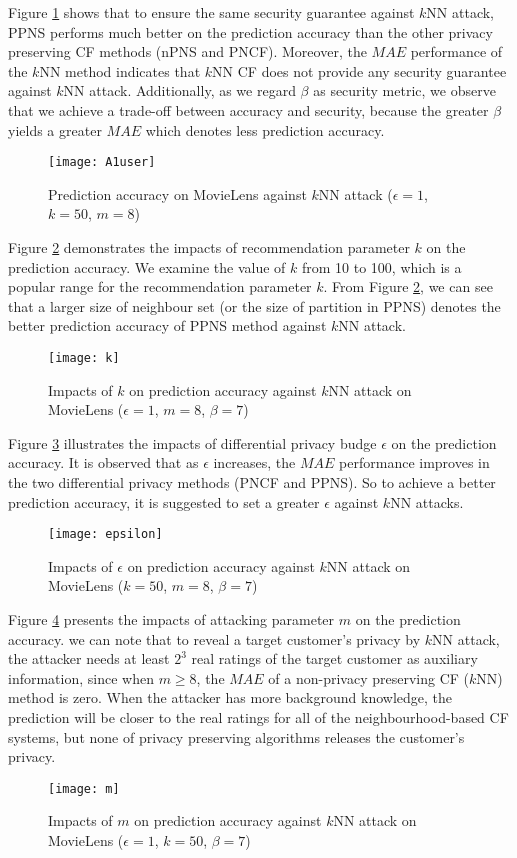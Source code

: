 \documentclass[11pt]{article}
\begin{document}
Figure \ref{fig:A1user} shows that to ensure the same security guarantee against $k$NN attack, PPNS performs much better on the prediction accuracy than the other privacy preserving CF methods (nPNS and PNCF). Moreover, the $MAE$ performance of the $k$NN method indicates that $k$NN CF does not provide any security guarantee against $k$NN attack. Additionally, as we regard $\beta$ as security metric, we observe that we achieve a trade-off between accuracy and security, because the greater $\beta$ yields a greater $MAE$ which denotes less prediction accuracy.
\begin{figure}[!h]
\centering
\texttt{[image: A1user]}
\caption{Prediction accuracy on MovieLens against $k$NN attack ($\epsilon=1$, $k=50$, $m=8$)}
\label{fig:A1user}
\end{figure}

\newpage
Figure \ref{fig:k} demonstrates the impacts of recommendation parameter $k$ on the prediction accuracy. We examine the value of $k$ from 10 to 100, which is a popular range for the recommendation parameter $k$. From Figure \ref{fig:k}, we can see that a larger size of neighbour set (or the size of partition in PPNS) denotes the better prediction accuracy of PPNS method against $k$NN attack.
\begin{figure}[!h]
\centering
\texttt{[image: k]}
\caption{Impacts of $k$ on prediction accuracy against $k$NN attack on MovieLens ($\epsilon=1$, $m=8$, $\beta=7$)}
\label{fig:k}
\end{figure}

Figure \ref{fig:epsilon} illustrates the impacts of differential privacy budge $\epsilon$ on the prediction accuracy. It is observed that as $\epsilon$ increases, the $MAE$ performance improves in the two differential privacy methods (PNCF and PPNS). So to achieve a better prediction accuracy, it is suggested to set a greater $\epsilon$ against $k$NN attacks.
\begin{figure}[!h]
\centering
\texttt{[image: epsilon]}
\caption{Impacts of $\epsilon$ on prediction accuracy against $k$NN attack on MovieLens ($k=50$, $m=8$, $\beta=7$)}
\label{fig:epsilon}
\end{figure}

Figure \ref{fig:m} presents the impacts of attacking parameter $m$ on the prediction accuracy. we can note that to reveal a target customer's privacy by $k$NN attack, the attacker needs at least $2^3$ real ratings of the target customer as auxiliary information, since when $m \geq 8$, the $MAE$ of a non-privacy preserving CF ($k$NN) method is zero. When the attacker has more background knowledge, the prediction will be closer to the real ratings for all of the neighbourhood-based CF systems, but none of privacy preserving algorithms releases the customer's privacy.
\begin{figure}[!h]
\centering
\texttt{[image: m]}
\caption{Impacts of $m$ on prediction accuracy against $k$NN attack on MovieLens ($\epsilon=1$, $k=50$, $\beta=7$)}
\label{fig:m}
\end{figure}
\end{document}
